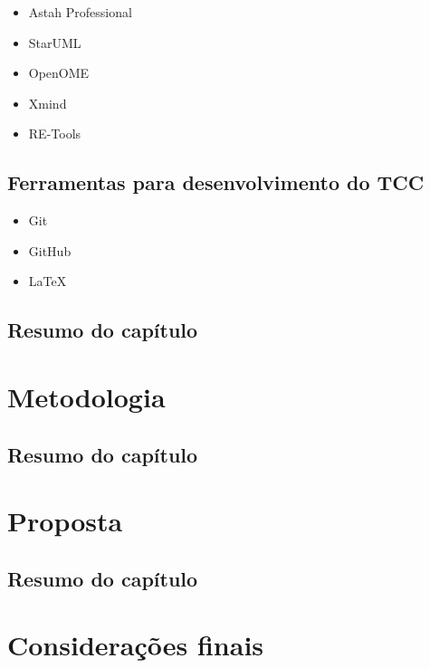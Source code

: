 \begin{itemize}
	\item Astah Professional
	\item StarUML
	\item OpenOME
	\item Xmind
	\item RE-Tools
\end{itemize}

\section{Ferramentas para desenvolvimento do TCC}
\label{ferramentasDesenvolvimento}

\begin{itemize}
	\item Git
	\item GitHub
	\item LaTeX 
\end{itemize}

\section{Resumo do capítulo}

\chapter{Metodologia}

\section{Resumo do capítulo}

\chapter{Proposta}

\section{Resumo do capítulo}

\chapter{Considerações finais}